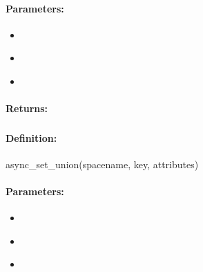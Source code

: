 \paragraph{Parameters:}
\begin{itemize}[noitemsep]
\item {}\\

\item {}\\

\item {}\\

\end{itemize}

\paragraph{Returns:}


\pagebreak
\subsubsection{}
\label{api:ruby:async_set_union}


\paragraph{Definition:}
\begin{rubycode}
async_set_union(spacename, key, attributes)
\end{rubycode}

\paragraph{Parameters:}
\begin{itemize}[noitemsep]
\item {}\\

\item {}\\

\item {}\\

\end{itemize}

